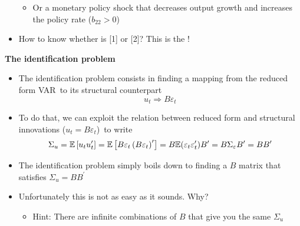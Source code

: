 \documentclass[10pt,english,t,aspectratio=169,ignorenonframetext]{beamer}
\begin{document}
\begin{frame}
\begin{itemize}
\begin{itemize}
\item[{[2]}] Or a monetary policy shock that decreases output growth and
increases the policy rate ($b_{22}>0$)\bigskip
\end{itemize}

\pause

\item How to know whether is {\small \color{title}[1]} or {\small\color{title}[2]}? This is the {}!
\end{itemize}
\end{frame}


\begin{frame}
{\textbf{The identification problem}}\smallskip

\begin{itemize}
\item The identification problem consists in finding a mapping from the
reduced form VAR\ to its structural counterpart%
\begin{equation*}
u_{t}\Rightarrow B\varepsilon _{t}
\end{equation*}
\pause

\item To do that, we can exploit the relation between reduced form and
structural innovations ($u_{t}=B\varepsilon _{t}$)\ to write%
\begin{equation*}
\Sigma _{u}=\mathbb{E}\left[ u_{t}u_{t}^{\prime }\right] =\mathbb{E}\left[
B\varepsilon _{t}\left( B\varepsilon _{t}\right) ^{\prime }\right] =B\mathbb{%
E}(\varepsilon _{t}\varepsilon _{t}^{\prime })B^{\prime }=B\Sigma
_{\varepsilon }B^{\prime }=BB^{\prime }
\end{equation*}

\item The identification problem simply boils down to finding a $B$ matrix
that satisfies $\Sigma _{u}=BB^{\prime }$\bigskip \pause

\item Unfortunately this is not as easy as it sounds. Why?\medskip

\begin{itemize}
\item Hint: There are infinite combinations of $B$ that give you
the same $\Sigma _{u}$
\end{itemize}
\end{itemize}
\end{frame}
\end{document}
